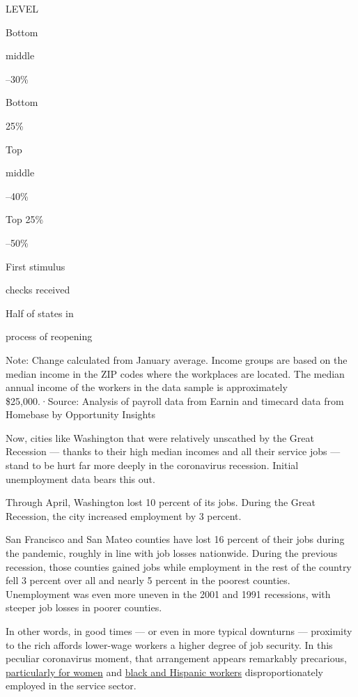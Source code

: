 LEVEL

Bottom

middle

--30\%

Bottom

25\%

Top

middle

--40\%

Top 25\%

--50\%

First stimulus

checks received

Half of states in

process of reopening

Note: Change calculated from January average. Income groups are based on
the median income in the ZIP codes where the workplaces are located. The
median annual income of the workers in the data sample is approximately
\$25,000.·Source: Analysis of payroll data from Earnin and timecard data
from Homebase by Opportunity Insights

Now, cities like Washington that were relatively unscathed by the Great
Recession --- thanks to their high median incomes and all their service
jobs --- stand to be hurt far more deeply in the coronavirus recession.
Initial unemployment data bears this out.

Through April, Washington lost 10 percent of its jobs. During the Great
Recession, the city increased employment by 3 percent.

San Francisco and San Mateo counties have lost 16 percent of their jobs
during the pandemic, roughly in line with job losses nationwide. During
the previous recession, those counties gained jobs while employment in
the rest of the country fell 3 percent over all and nearly 5 percent in
the poorest counties. Unemployment was even more uneven in the 2001 and
1991 recessions, with steeper job losses in poorer counties.

In other words, in good times --- or even in more typical downturns ---
proximity to the rich affords lower-wage workers a higher degree of job
security. In this peculiar coronavirus moment, that arrangement appears
remarkably precarious,
\href{https://www.nytimes3xbfgragh.onion/2020/05/09/us/unemployment-coronavirus-women.html}{particularly
for women} and
\href{https://www.nytimes3xbfgragh.onion/interactive/2020/05/13/upshot/coronavirus-america-job-losses-slowing-tracker.html}{black
and Hispanic workers} disproportionately employed in the service sector.

